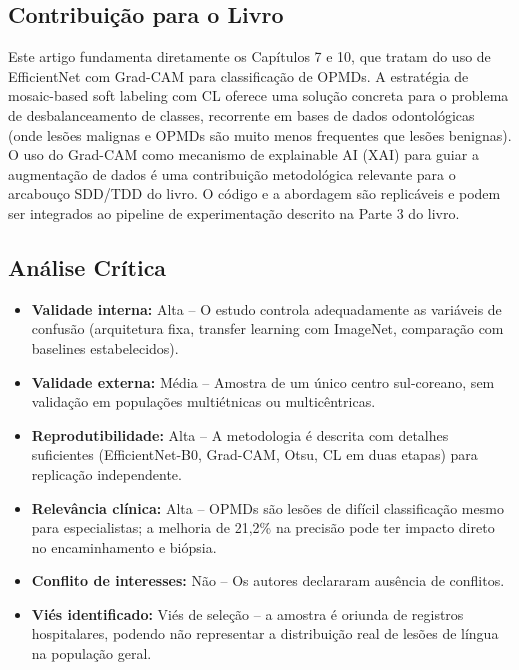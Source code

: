\subsection{Contribuição para o Livro}
Este artigo fundamenta diretamente os Capítulos 7 e 10, que tratam do uso de
EfficientNet com Grad-CAM para classificação de OPMDs. A estratégia de
mosaic-based soft labeling com CL oferece uma solução concreta para o problema
de desbalanceamento de classes, recorrente em bases de dados odontológicas
(onde lesões malignas e OPMDs são muito menos frequentes que lesões benignas).
O uso do Grad-CAM como mecanismo de explainable AI (XAI) para guiar a
augmentação de dados é uma contribuição metodológica relevante para o arcabouço
SDD/TDD do livro. O código e a abordagem são replicáveis e podem ser integrados
ao pipeline de experimentação descrito na Parte 3 do livro.

\subsection{Análise Crítica}
\begin{itemize}
  \item \textbf{Validade interna:} Alta -- O estudo controla adequadamente as
        variáveis de confusão (arquitetura fixa, transfer learning com ImageNet,
        comparação com baselines estabelecidos).
  \item \textbf{Validade externa:} Média -- Amostra de um único centro sul-coreano,
        sem validação em populações multiétnicas ou multicêntricas.
  \item \textbf{Reprodutibilidade:} Alta -- A metodologia é descrita com detalhes
        suficientes (EfficientNet-B0, Grad-CAM, Otsu, CL em duas etapas) para
        replicação independente.
  \item \textbf{Relevância clínica:} Alta -- OPMDs são lesões de difícil
        classificação mesmo para especialistas; a melhoria de 21,2\% na precisão
        pode ter impacto direto no encaminhamento e biópsia.
  \item \textbf{Conflito de interesses:} Não -- Os autores declararam ausência de
        conflitos.
  \item \textbf{Viés identificado:} Viés de seleção -- a amostra é oriunda de
        registros hospitalares, podendo não representar a distribuição real de
        lesões de língua na população geral.
\end{itemize}

